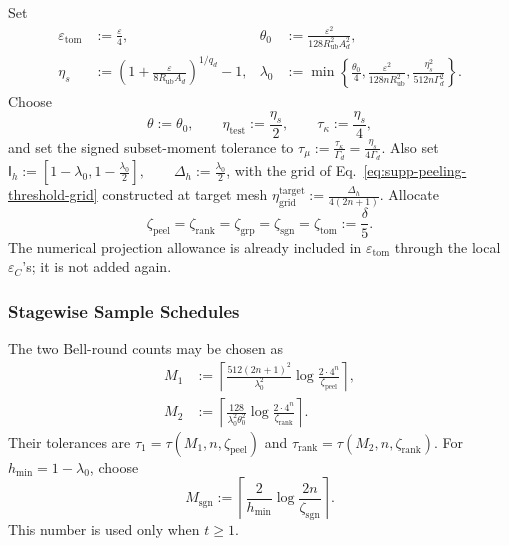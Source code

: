 \documentclass[
  aps,
  prx,
  reprint,
  superscriptaddress,
  amsmath,
  amssymb,
  nofootinbib,
  longbibliography
]{revtex4-2}
\begin{document}
Set
\begin{align}
\varepsilon_{\mathrm{tom}}
&:=\frac{\varepsilon}{4},
&
\theta_0
&:=
\frac{\varepsilon^2}
{128R_{\mathrm{ub}}^2A_d^2},
\label{eq:supp-calibrated-accuracy-scales}\\
\eta_s
&:=
\left(
1+\frac{\varepsilon}{8R_{\mathrm{ub}}A_d}
\right)^{1/q_d}-1,
&
\lambda_0
&:=
\min\left\{
\frac{\theta_0}{4},
\frac{\varepsilon^2}{128nR_{\mathrm{ub}}^2},
\frac{\eta_s^2}{512n\Gamma_d^2}
\right\}.
\label{eq:supp-calibrated-grouping-peeling-scales}
\end{align}
Choose
\begin{equation}
\theta:=\theta_0,\qquad
\eta_{\mathrm{test}}:=\frac{\eta_s}{2},\qquad
\tau_\kappa:=\frac{\eta_s}{4},
\label{eq:supp-calibrated-thresholds}
\end{equation}
and set the signed subset-moment tolerance to
$\tau_\mu
:=
\frac{\tau_\kappa}{\Gamma_d}
=
\frac{\eta_s}{4\Gamma_d}$.  Also set
$
\mathsf I_h
:=
\left[1-\lambda_0,1-\frac{\lambda_0}{2}\right],
\qquad
\Delta_h:=\frac{\lambda_0}{2}
$,
with the grid of
Eq.~\eqref{eq:supp-peeling-threshold-grid} constructed at target mesh
$\eta_{\mathrm{grid}}^{\mathrm{target}}
:=
\frac{\Delta_h}{4(2n+1)}$.
Allocate
\begin{equation}
\zeta_{\mathrm{peel}}
=\zeta_{\mathrm{rank}}
=\zeta_{\mathrm{grp}}
=\zeta_{\mathrm{sgn}}
=\zeta_{\mathrm{tom}}
:=
\frac{\delta}{5}.
\label{eq:supp-calibrated-failure-allocation}
\end{equation}
The numerical projection allowance is already included in
\(\varepsilon_{\mathrm{tom}}\) through the local
\(\varepsilon_C\)'s; it is not added again.

\subsubsection{Stagewise Sample Schedules}
\label{sec:supp-calibrated-stagewise-schedules}

The two Bell-round counts may be chosen as
\begin{align}
M_1
&:=
\left\lceil
\frac{512(2n+1)^2}{\lambda_0^2}
\log\frac{2\cdot4^n}{\zeta_{\mathrm{peel}}}
\right\rceil,
\label{eq:supp-calibrated-first-bell-rounds}\\
M_2
&:=
\left\lceil
\frac{128}{\lambda_0^2\theta_0^2}
\log\frac{2\cdot4^n}{\zeta_{\mathrm{rank}}}
\right\rceil.
\label{eq:supp-calibrated-second-bell-rounds}
\end{align}
Their tolerances are
\(\tau_1=\tau(M_1,n,\zeta_{\mathrm{peel}})\) and
\(\tau_{\mathrm{rank}}=\tau(M_2,n,\zeta_{\mathrm{rank}})\).
For \(h_{\min}=1-\lambda_0\), choose
\begin{equation}
M_{\mathrm{sgn}}
:=
\left\lceil
\frac{2}{h_{\min}}
\log\frac{2n}{\zeta_{\mathrm{sgn}}}
\right\rceil.
\label{eq:supp-calibrated-sign-count}
\end{equation}
This number is used only when \(t\ge1\).
\end{document}
